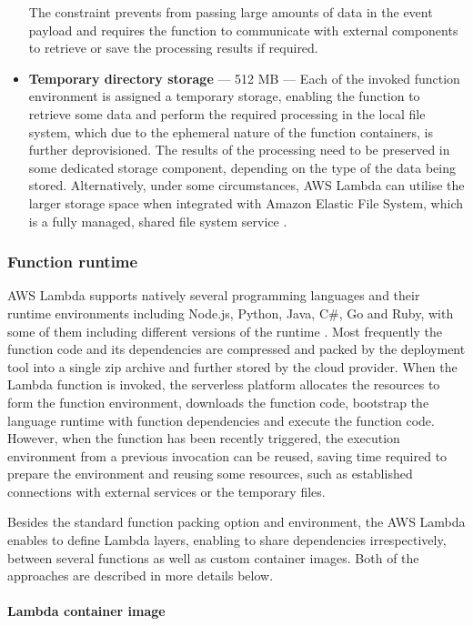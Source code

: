 \begin{itemize}
   The constraint prevents from passing large amounts of data in the event payload and requires the function to communicate with external components to retrieve or save the processing results if required.
   \item \textbf{Temporary directory storage} --- 512 MB --- Each of the invoked function environment is assigned a temporary storage, enabling the function to retrieve some data and perform the required processing in the local file system, which due to the ephemeral nature of the function containers, is further deprovisioned. The results of the processing need to be preserved in some dedicated storage component, depending on the type of the data being stored. Alternatively, under some circumstances, AWS Lambda can utilise the larger storage space when integrated with Amazon Elastic File System, which is a fully managed, shared file system service \cite{AWSLambdaEFS}.
\end{itemize}

\subsubsection{Function runtime} \label{chapter:lambda-custom-runtimes}

AWS Lambda supports natively several programming languages and their runtime environments including Node.js, Python, Java, C\#, Go and Ruby, with some of them including different versions of the runtime \cite{AWSLambdaRuntimes}. Most frequently the function code and its dependencies are compressed and packed by the deployment tool into a single zip archive and further stored by the cloud provider. When the Lambda function is invoked, the serverless platform allocates the resources to form the function environment, downloads the function code, bootstrap the language runtime with function dependencies and execute the function code. However, when the function has been recently triggered, the execution environment from a previous invocation can be reused, saving time required to prepare the environment and reusing some resources, such as established connections with external services or the temporary files.

Besides the standard function packing option and environment, the AWS Lambda enables to define Lambda layers, enabling to share dependencies irrespectively, between several functions as well as custom container images.
Both of the approaches are described in more details below.

\paragraph{Lambda container image}

